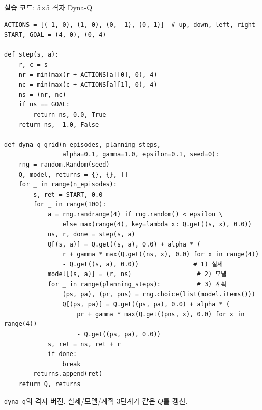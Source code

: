 \begin{frame}[fragile,shrink=40]{실습 코드: 5$\times$5 격자 Dyna-Q}
  \begin{lstlisting}[basicstyle=\ttfamily\scriptsize]
ACTIONS = [(-1, 0), (1, 0), (0, -1), (0, 1)]  # up, down, left, right
START, GOAL = (4, 0), (0, 4)

def step(s, a):
    r, c = s
    nr = min(max(r + ACTIONS[a][0], 0), 4)
    nc = min(max(c + ACTIONS[a][1], 0), 4)
    ns = (nr, nc)
    if ns == GOAL:
        return ns, 0.0, True
    return ns, -1.0, False

def dyna_q_grid(n_episodes, planning_steps,
                alpha=0.1, gamma=1.0, epsilon=0.1, seed=0):
    rng = random.Random(seed)
    Q, model, returns = {}, {}, []
    for _ in range(n_episodes):
        s, ret = START, 0.0
        for _ in range(100):
            a = rng.randrange(4) if rng.random() < epsilon \
                else max(range(4), key=lambda x: Q.get((s, x), 0.0))
            ns, r, done = step(s, a)
            Q[(s, a)] = Q.get((s, a), 0.0) + alpha * (
                r + gamma * max(Q.get((ns, x), 0.0) for x in range(4))
                - Q.get((s, a), 0.0))               # 1) 실제
            model[(s, a)] = (r, ns)                  # 2) 모델
            for _ in range(planning_steps):          # 3) 계획
                (ps, pa), (pr, pns) = rng.choice(list(model.items()))
                Q[(ps, pa)] = Q.get((ps, pa), 0.0) + alpha * (
                    pr + gamma * max(Q.get((pns, x), 0.0) for x in range(4))
                    - Q.get((ps, pa), 0.0))
            s, ret = ns, ret + r
            if done:
                break
        returns.append(ret)
    return Q, returns
  \end{lstlisting}
  {\footnotesize \texttt{dyna\_q}의 격자 버전. 실제/모델/계획 3단계가
  같은 $Q$를 갱신.}
\end{frame}
